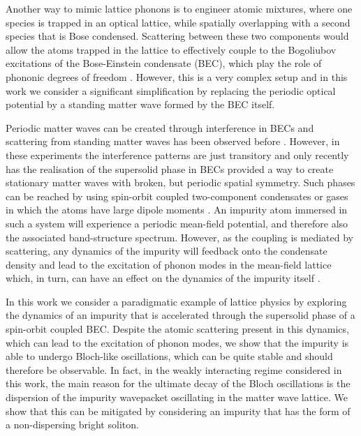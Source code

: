 \documentclass[12pt]{iopart}
\begin{document}
Another way to mimic lattice phonons is to engineer atomic mixtures, where one species is trapped in an optical lattice, while spatially overlapping with a second species that is Bose condensed. Scattering between these two components would allow the atoms trapped in the lattice to effectively couple to the Bogoliubov excitations of the Bose-Einstein condensate (BEC), which play the role of phononic degrees of freedom \cite{parish:2015,parish:2018}. However, this is a very complex setup and in this work we consider a significant simplification by replacing the periodic optical potential by a standing matter wave formed by the BEC itself. 

Periodic matter waves can be created through interference in BECs \cite{Andrews:1997} and scattering from standing matter waves has been observed before \cite{Deng:1999,Trippenbach:2000}. However, in these experiments the interference patterns are just transitory and only recently has the realisation of the supersolid phase in BECs provided a way to create stationary matter waves with broken, but periodic spatial symmetry. Such phases can be reached by using spin-orbit coupled two-component condensates \cite{Lonard:2017,li_2017} or gases in which the atoms have large dipole moments \cite{stringari_dipolar:2019,ferlaino_dipolar:2019,Guo_2019}. An impurity atom immersed in such a system will experience a periodic mean-field potential, and therefore also the associated band-structure spectrum. However, as the coupling is mediated by scattering, any dynamics of the impurity will feedback onto the condensate density and lead to the excitation of phonon modes in the mean-field lattice which, in turn, can have an effect on the dynamics of the impurity itself \cite{grusdt:2015, grusdt:2017}.


In this work we consider a paradigmatic example of lattice physics by exploring the dynamics of an impurity that is accelerated through the supersolid phase of a spin-orbit coupled BEC. Despite the atomic scattering present in this dynamics, which can lead to the excitation of phonon modes, we show that the impurity is able to undergo Bloch-like oscillations, which can be quite stable and should therefore be observable. In fact, in the weakly interacting regime considered in this work, the main reason for the ultimate decay of the Bloch oscillations is the dispersion of the impurity wavepacket oscillating in the matter wave lattice. We show that this can be mitigated by considering an impurity that has the form of a non-dispersing bright soliton.
\end{document}
